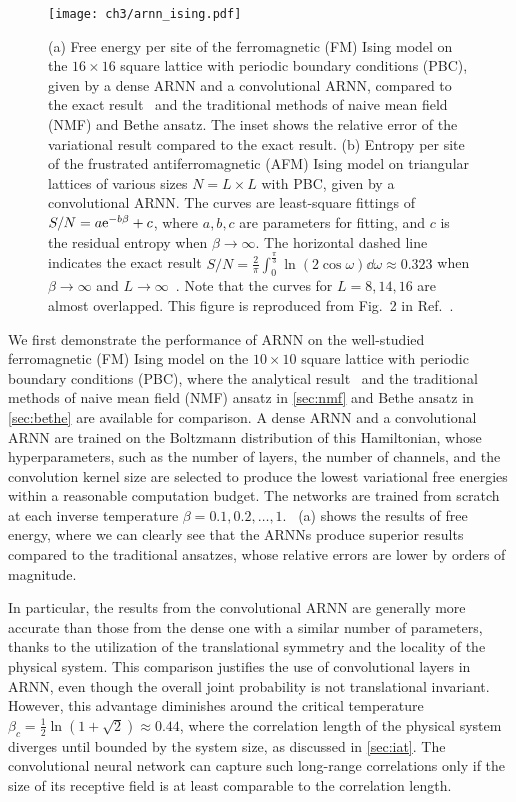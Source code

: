 \begin{figure}[htb]
\centering
\texttt{[image: ch3/arnn\_ising.pdf]}
\caption[ARNN results of Ising model on square and triangular lattices]{
(a) Free energy per site of the ferromagnetic (FM) Ising model on the $16 \times 16$ square lattice with periodic boundary conditions (PBC), given by a dense ARNN and a convolutional ARNN, compared to the exact result~\cite{onsager1944crystal} and the traditional methods of naive mean field (NMF) and Bethe ansatz.
The inset shows the relative error of the variational result compared to the exact result.
(b) Entropy per site of the frustrated antiferromagnetic (AFM) Ising model on triangular lattices of various sizes $N = L \times L$ with PBC, given by a convolutional ARNN.
The curves are least-square fittings of $S / N = a \mathrm{e}^{-b \beta} + c$, where $a, b, c$ are parameters for fitting, and $c$ is the residual  entropy when $\beta \to \infty$.
The horizontal dashed line indicates the exact result $S / N = \frac{2}{\pi} \int_0^{\frac{\pi}{3}} \ln(2 \cos \omega) \dd \omega \approx 0.323$ when $\beta \to \infty$ and $L \to \infty$~\cite{wannier1950antiferromagnetism, wannier1973antiferromagnetism}.
Note that the curves for $L = 8, 14, 16$ are almost overlapped.
This figure is reproduced from Fig.~2 in Ref.~\cite{wu2019solving}.
}
\label{fig:arnn-ising}
\end{figure}

We first demonstrate the performance of ARNN on the well-studied ferromagnetic (FM) Ising model on the $10 \times 10$ square lattice with periodic boundary conditions (PBC), where the analytical result~\cite{onsager1944crystal} and the traditional methods of naive mean field (NMF) ansatz in \cref{sec:nmf} and Bethe ansatz in \cref{sec:bethe} are available for comparison. A dense ARNN and a convolutional ARNN are trained on the Boltzmann distribution of this Hamiltonian, whose hyperparameters, such as the number of layers, the number of channels, and the convolution kernel size are selected to produce the lowest variational free energies within a reasonable computation budget. The networks are trained from scratch at each inverse temperature $\beta = 0.1, 0.2, \ldots, 1$. ~(a) shows the results of free energy, where we can clearly see that the ARNNs produce superior results compared to the traditional ansatzes, whose relative errors are lower by orders of magnitude.

In particular, the results from the convolutional ARNN are generally more accurate than those from the dense one with a similar number of parameters, thanks to the utilization of the translational symmetry and the locality of the physical system. This comparison justifies the use of convolutional layers in ARNN, even though the overall joint probability is not translational invariant. However, this advantage diminishes around the critical temperature $\beta_c = \frac{1}{2} \ln(1 + \sqrt{2}) \approx 0.44$, where the correlation length of the physical system diverges until bounded by the system size, as discussed in \cref{sec:iat}. The convolutional neural network can capture such long-range correlations only if the size of its receptive field is at least comparable to the correlation length.

